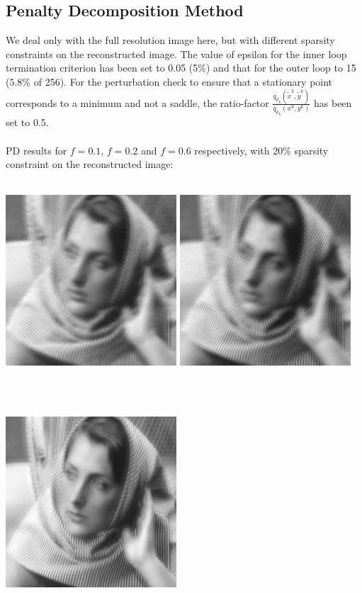 \documentclass[letterpaper, 10 pt, conference]{article}
\begin{document}
\subsection{Penalty Decomposition Method}

We deal only with the full resolution image here, but with different sparsity constraints on the reconstructed image. The value of epsilon for the inner loop termination criterion has been set to 0.05 (5$\%$) and that for the outer loop to 15 ($5.8\%$ of 256). For the perturbation check to ensure that a stationary point corresponds to a minimum and not a saddle, the ratio-factor $\frac{q_{\rho_k}(\tilde{x}^k,\tilde{y}^k)}{q_{\rho_k}(x^k,y^k)}$ has been set to 0.5.\\ \\
PD results for $f=0.1$, $f=0.2$ and $f=0.6$ respectively, with 20$\%$ sparsity constraint on the reconstructed image: \\ \\
\centerline{\includegraphics[scale=0.5]{out-PD-0_1f-0_2s-full-pc.png} \includegraphics[scale=0.5]{out-PD-0_2f-0_2s-full-pc.png}} \\ \\
\centerline{ \includegraphics[scale=0.5]{out-PD-0_6f-0_2s-full-pc.png}} \\ \\
\end{document}
